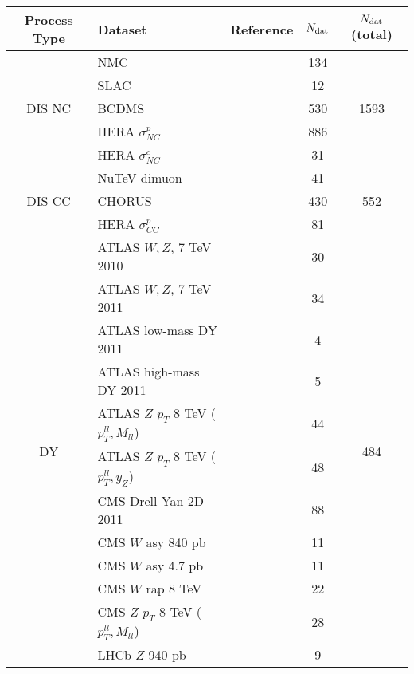 \begin{center}
  \renewcommand*{\arraystretch}{1.50}
  \small
\begin{tabular}{|c|l|c|c|c|}
\toprule
  Process Type & Dataset   &  Reference    &  $N_{\rm dat}$     & $N_{\rm dat}$ (total)      \\
\midrule
\multirow{5}{*}{DIS NC}  & NMC    &  \cite{Arneodo:1996kd,Arneodo:1996qe}  & 134  &
\multirow{5}{*}{1593} \\
        & SLAC     & \cite{Whitlow:1991uw}     & 12  &    \\
        & BCDMS   & \cite{bcdms1,bcdms2}      & 530  & \\
        & HERA $\sigma^p_{NC}$     & \cite{Abramowicz:2015mha} & 886  & \\
        & HERA $\sigma^c_{NC}$     & \cite{Abramowicz:1900rp}  & 31  & \\
\midrule
\multirow{3}{*}{DIS CC}  & NuTeV dimuon  &\cite{Goncharov:2001qe,MasonPhD}
& 41  &
\multirow{3}{*}{552}\\
         & CHORUS  & \cite{Onengut:2005kv} & 430  &\\
        & HERA $\sigma^p_{CC}$   & \cite{Abramowicz:2015mha}& 81  & \\
\midrule
\multirow{19}{*}{DY}      &
  ATLAS $W,Z$, 7 TeV 2010  & \cite{Aad:2011dm} & 30  & \multirow{19}{*}{484}  \\
& ATLAS $W,Z$, 7 TeV 2011  &  \cite{Aaboud:2016btc} & 34  & \\
& ATLAS low-mass DY 2011  & \cite{Aad:2014qja} & 4  &\\
& ATLAS high-mass DY 2011  & \cite{Aad:2013iua} & 5  &\\
& ATLAS $Z$ $p_T$ 8 TeV ($p_T^{ll}, M_{ll}$) & \cite{Aad:2015auj} & 44  &\\
& ATLAS $Z$ $p_T$ 8 TeV ($p_T^{ll}, y_Z$) & \cite{Aad:2015auj} &  48   &\\
& CMS Drell-Yan 2D 2011    &  \cite{Chatrchyan:2013tia}    & 88  &   \\
& CMS $W$ asy 840 pb   & \cite{Chatrchyan:2012xt}    & 11   &   \\
& CMS $W$ asy 4.7 pb       & \cite{Chatrchyan:2013mza}  &11   & \\
& CMS $W$ rap 8 TeV   &  \cite{Khachatryan:2016pev}     &  22  &     \\
& CMS $Z$ $p_T$ 8 TeV ($p_T^{ll},M_{ll}$)      &  \cite{Khachatryan:2015oaa}    & 28  &  \\
& LHCb $Z$ 940 pb      &  \cite{Aaij:2012vn}    & 9  &  \\

\end{tabular}
\end{center}
